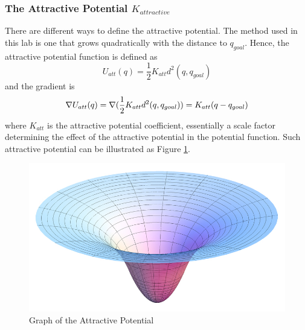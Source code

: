 \documentclass[11pt]{article} %
\begin{document}
\subsubsection{The Attractive Potential $K_{attractive}$}
There are different ways to define the attractive potential.  The method used in this lab is one that grows quadratically with the distance to $q_{goal}$.  Hence, the attractive potential function is defined as
\begin{equation}
	U_{att}(q) = \frac{1}{2}K_{att}d^2(q, q_{goal})
\end{equation}
and the gradient is
\begin{equation}
	\nabla U_{att}(q) = \nabla (\frac{1}{2}K_{att}d^2(q,q_{goal})) \\
	= K_{att}(q-q_{goal})
\end{equation}
where $K_{att}$ is the attractive potential coefficient, essentially a scale factor determining the effect of the attractive potential in the potential function.  Such attractive potential can be illustrated as Figure \ref{f:potential_att_graph}.
\begin{figure}[hbt]
 \centering
 \includegraphics[scale=0.5]{potential_attractive.png}
 \caption{Graph of the Attractive Potential}
 \label{f:potential_att_graph}
\end{figure}
\end{document}
